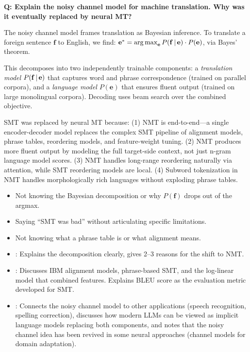 \begin{interviewq}
\textbf{Q: Explain the noisy channel model for machine translation.  Why
was it eventually replaced by neural MT?}

 \quad {} \quad \badgefreq{\freqlow}

\stronganswer
The noisy channel model frames translation as Bayesian inference.  To
translate a foreign sentence $\mathbf{f}$ to English, we find:
$\mathbf{e}^* = \operatorname*{arg\,max}_{\mathbf{e}} P(\mathbf{f} \,|\, \mathbf{e}) \cdot P(\mathbf{e})$,
via Bayes' theorem.

This decomposes into two independently trainable components: a
\emph{translation model} $P(\mathbf{f} \,|\, \mathbf{e})$ that captures
word and phrase correspondence (trained on parallel corpora), and a
\emph{language model} $P(\mathbf{e})$ that ensures fluent output (trained on
large monolingual corpora).  Decoding uses beam search over the combined
objective.

SMT was replaced by neural MT because: (1) NMT is end-to-end---a single
encoder-decoder model replaces the complex SMT pipeline of alignment models,
phrase tables, reordering models, and feature-weight tuning.  (2) NMT produces
more fluent output by modeling the full target-side context, not just n-gram
language model scores.  (3) NMT handles long-range reordering naturally via
attention, while SMT reordering models are local.  (4) Subword tokenization
in NMT handles morphologically rich languages without exploding phrase tables.

\redflags
\begin{itemize}
    \item Not knowing the Bayesian decomposition or why $P(\mathbf{f})$ drops
          out of the argmax.
    \item Saying ``SMT was bad'' without articulating specific limitations.
    \item Not knowing what a phrase table is or what alignment means.
\end{itemize}


\goodgreat
\begin{itemize}
    \item {}: Explains the decomposition clearly, gives 2--3
          reasons for the shift to NMT.
    \item {}: Discusses IBM alignment models, phrase-based SMT,
          and the log-linear model that combined features.  Explains
          BLEU score as the evaluation metric developed for SMT.
    \item {}: Connects the noisy channel model to other
          applications (speech recognition, spelling correction), discusses
          how modern LLMs can be viewed as implicit language models replacing
          both components, and notes that the noisy channel idea has been
          revived in some neural approaches (channel models for domain
          adaptation).
\end{itemize}


\end{interviewq}
